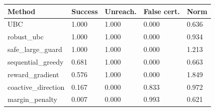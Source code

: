 \begin{tabular}{lllll}
\toprule
Method & Success & Unreach. & False cert. & Norm \\
\midrule
UBC & 1.000 & 1.000 & 0.000 & 0.636 \\
robust\_ubc & 1.000 & 1.000 & 0.000 & 0.934 \\
safe\_large\_guard & 1.000 & 1.000 & 0.000 & 1.213 \\
sequential\_greedy & 0.681 & 1.000 & 0.000 & 0.663 \\
reward\_gradient & 0.576 & 1.000 & 0.000 & 1.849 \\
coactive\_direction & 0.167 & 0.000 & 0.833 & 0.972 \\
margin\_penalty & 0.007 & 0.000 & 0.993 & 0.621 \\
\bottomrule
\end{tabular}
